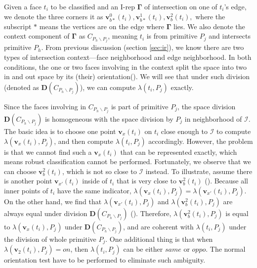 \documentclass[10pt,journal,compsoc]{IEEEtran}
\begin{document}
Given a face $t_i$ to be classified and an I-rep $\boldsymbol\Gamma$ of intersection on one of $t_i$'s edge, we denote the three corners it as $\bm{v}_{b*}^{0}(t_i), \bm{v}_{b*}^{1}(t_i), \bm{v}_b^2(t_i),$ where the subscript $*$ means the vertices are on the edge where $\boldsymbol\Gamma$ lies. We also denote the context component of $\boldsymbol\Gamma$ as $C_{P_h \backslash P_j}$, meaning $t_i$ is from primitive $P_j$ and intersects primitive $P_h$. From previous discussion (section \ref{sec:ir}){\color{red}{may be more than one}}, we know there are two types of intersection context---face neighborhood and edge neighborhood. In both conditions, the one or two faces involving in the context split the space into two in and out space by its (their) orientation(). We will see that under such division (denoted as $\boldsymbol{D}(C_{P_h \backslash P_j})$), we can compute $\lambda(t_i, P_j)$ exactly.

Since the faces involving in $C_{P_h \backslash P_j}$ is part of primitive $P_j$, the space division $\boldsymbol{D}(C_{P_h \backslash P_j})$ is homogeneous with the space division by $P_j$ in neighborhood of $\bm{\mathcal{I}}$. The basic idea is to choose one point $\bm{v}_x(t_i)$ on $t_i$ close enough to $\bm{\mathcal{I}}$ to compute $\lambda(\bm{v}_x(t_i), P_j)$, and then compute $\lambda(t_i, P_j)$ accordingly. However, the problem is that we cannot find such a $\bm{v}_x(t_i)$ that can be represented exactly, which means robust classification cannot be performed. Fortunately, we observe that we can choose $\bm{v}_b^2(t_i)$, which is not so close to $\bm{\mathcal{I}}$ instead. To illustrate, assume there is another point $\bm{v}_{x'}(t_i)$ inside of $t_i$ that is very close to $\bm{v}_b^2(t_i)$ ({\color{red}{Fig. x}}). Because all inner points of $t_i$ have the same indicator, $\lambda(\bm{v}_x(t_i), P_j) = \lambda(\bm{v}_{x'}(t_i), P_j)$. On the other hand, we find that $\lambda(\bm{v}_{x'}(t_i), P_j)$ and $\lambda(\bm{v}_b^2(t_i), P_j)$ are always equal under division $\boldsymbol{D}(C_{P_h \backslash P_j})$ ({}). Therefore, $\lambda(\bm{v}_b^2(t_i), P_j)$ is equal to $\lambda(\bm{v}_x(t_i), P_j)$ under $\boldsymbol{D}(C_{P_h \backslash P_j})$, and are coherent with $\lambda(t_i, P_j)$ under the division of whole primitive $P_j$. One additional thing is that when $\lambda(\bm{v}_2(t_i), P_j)=on$, then $\lambda(t_i, P_j)$ can be either $same$ or $oppo$. The normal orientation test have to be performed to eliminate such ambiguity.
\end{document}
